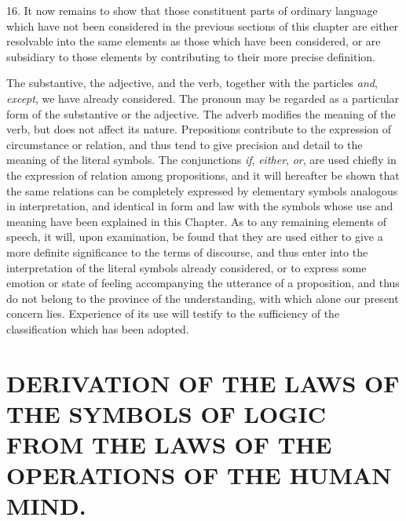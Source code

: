 \documentclass[oneside]{book}
\begin{document}
16. It now remains to show that those constituent parts of
ordinary language which have not been considered in the previous
sections of this chapter are either resolvable into the same
elements as those which have been considered, or are subsidiary
to those elements by contributing to their more precise definition.

The substantive, the adjective, and the verb, together with
the particles \textit{and}, \textit{except}, we have already considered. The pronoun
may be regarded as a particular form of the substantive or
the adjective. The adverb modifies the meaning of the verb, but
does not affect its nature. Prepositions contribute to the expression
of circumstance or relation, and thus tend to give precision
and detail to the meaning of the literal symbols. The
conjunctions \textit{if}, \textit{either}, \textit{or}, are used chiefly in the expression of
relation among propositions, and it will hereafter be shown that
the same relations can be completely expressed by elementary
symbols analogous in interpretation, and identical in form and
law with the symbols whose use and meaning have been explained
in this Chapter. As to any remaining elements of
speech, it will, upon examination, be found that they are used
either to give a more definite significance to the terms of discourse,
and thus enter into the interpretation of the literal symbols
already considered, or to express some emotion or state of
feeling accompanying the utterance of a proposition, and thus do
not belong to the province of the understanding, with which
alone our present concern lies. Experience of its use will testify
to the sufficiency of the classification which has been adopted.


\chapter[DERIVATION OF THE LAWS]{\large DERIVATION OF THE LAWS OF THE SYMBOLS OF LOGIC FROM THE
LAWS OF THE OPERATIONS OF THE HUMAN MIND.}
\end{document}
